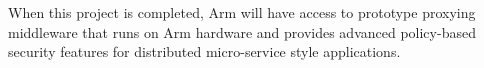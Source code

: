 \documentclass[a4paper]{article}
\begin{document}
When this project is completed, Arm will have access to prototype
proxying middleware that runs on Arm hardware and provides advanced
policy-based security features for distributed micro-service style
applications.







\end{document}
